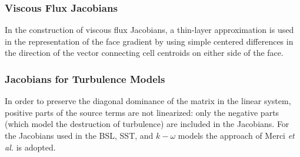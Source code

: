 \subsubsection{Viscous Flux Jacobians}

In the construction of viscous flux Jacobians, a thin-layer
approximation is used in the representation of the face gradient by
using simple centered differences in the direction of the vector
connecting cell centroids on either side of the face.

\subsubsection{Jacobians for Turbulence Models}

In order to preserve the diagonal dominance of the matrix in the
linear system, positive parts of the source terms are not linearized:
only the negative parts (which model the destruction of turbulence)
are included in the Jacobians.  For the Jacobians used in the BSL,
SST, and $k-\omega$ models the approach of Merci {\sl et
  al.\/}\cite{Merci.00} is adopted.


